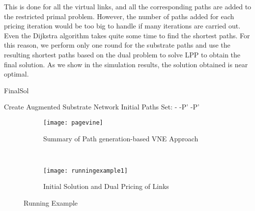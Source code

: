 \documentclass[journal]{IEEEtran}
\begin{document}
This is done for all the virtual links, and all the corresponding paths are added to the restricted primal problem. However, the number of paths added for each pricing iteration would be too big to handle if many iterations are carried out. Even the Dijkstra algorithm takes quite some time to find the shortest paths. For this reason, we perform only one round for the substrate paths and use the resulting shortest paths based on the dual problem to solve LPP to obtain the final solution. As we show in the simulation results, the solution obtained is near optimal.

\begin{algorithm}[t]
\caption{ FinalSol}
\label{ColGen}
\begin{algorithmic}[1]
\STATE Create Augmented Substrate Network
\STATE Initial Paths Set: -
\STATE -P'
\FOR{}
\FOR{}
\FOR{}
\STATE 
\ENDFOR
\ENDFOR
\ENDFOR
\STATE -P'
\end{algorithmic}
\end{algorithm}

\begin{figure*}[ht!]
    \centering
        \begin{subfigure}[t]{0.4\textwidth}
        \centering
        \texttt{[image: pagevine]}
        \caption{Summary of Path generation-based VNE Approach}
        \label{cgfig}
    \end{subfigure}
     ~
    \begin{subfigure}[t]{0.58\textwidth}
        \centering
        \texttt{[image: runningexample1]}
        \caption{Initial Solution and Dual Pricing of Links}
        \label{runex2}
    \end{subfigure}   
    \caption{Running Example}
\end{figure*}
\end{document}
